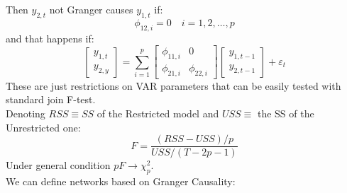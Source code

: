 Then $y_{2,t}$ not Granger causes $y_{1,t}$ if:
\[
\phi_{12,i} = 0 \quad i =1,2,\ldots,p
\]
and that happens if:
\[
\begin{bmatrix}
	y_{1,t} \\
	y_{2,y}
\end{bmatrix}
=
\sum_{i=1}^{p} \begin{bmatrix}
	\phi_{11,i} & 0\\
	\phi_{21,i} & \phi_{22,i}
\end{bmatrix}
\begin{bmatrix}
	y_{1,t-1} \\
	y_{2,t-1}
\end{bmatrix}
+ \varepsilon_t
\]
These are just restrictions on VAR parameters that can be easily tested with standard join F-test.\\
Denoting $RSS \equiv SS$ of the Restricted model and $USS \equiv$ the SS of the Unrestricted one:
\[
F = \frac{(RSS-USS)/p}{USS/(T-2p-1)}
\]
Under general condition $pF \to \chi^2_p$.\\
We can define networks based on Granger Causality:
